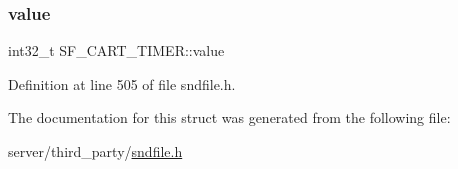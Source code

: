 \subsubsection{\texorpdfstring{value}{value}}
{\footnotesize\ttfamily int32\+\_\+t S\+F\+\_\+\+C\+A\+R\+T\+\_\+\+T\+I\+M\+E\+R\+::value}



Definition at line 505 of file sndfile.\+h.



The documentation for this struct was generated from the following file\+:\begin{DoxyCompactItemize}
\item 
server/third\+\_\+party/\mbox{\hyperlink{sndfile_8h}{sndfile.\+h}}\end{DoxyCompactItemize}
